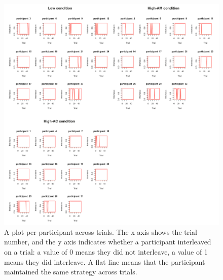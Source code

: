 \begin{figure}[!htbp]
\includegraphics[width=\textwidth,keepaspectratio]{images/ch34/ch34_individualInterleaving.pdf}
    \caption[Study 4 interleaving rates per participant]{A plot per participant across trials. The x axis shows the trial number, and the y axis indicates whether a participant interleaved on a trial: a value of 0 means they did not interleave, a value of 1 means they did interleave. A flat line means that the participant maintained the same strategy across trials.}\label{fig:ch34_4-plotpp}
\end{figure}

